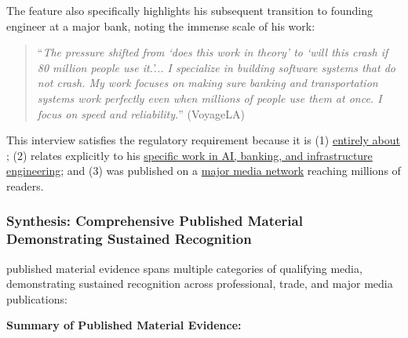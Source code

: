 The feature also specifically highlights his subsequent transition to founding engineer at a major bank, noting the immense scale of his work:

\begin{quote}
``\textit{The pressure shifted from `does this work in theory' to `will this crash if 80 million people use it.'... I specialize in building software systems that do not crash. My work focuses on making sure banking and transportation systems work perfectly even when millions of people use them at once. I focus on speed and reliability.}'' (VoyageLA)
\end{quote}

This interview satisfies the regulatory requirement because it is (1) \underline{entirely about \dr}; (2) relates explicitly to his \underline{specific work in AI, banking, and infrastructure engineering}; and (3) was published on a \underline{major media network} reaching millions of readers.


\subsubsection{Synthesis: Comprehensive Published Material Demonstrating Sustained Recognition}
\label{media:synthesis}

\drs published material evidence spans multiple categories of qualifying media, demonstrating sustained recognition across professional, trade, and major media publications:

\textbf{Summary of Published Material Evidence:}

